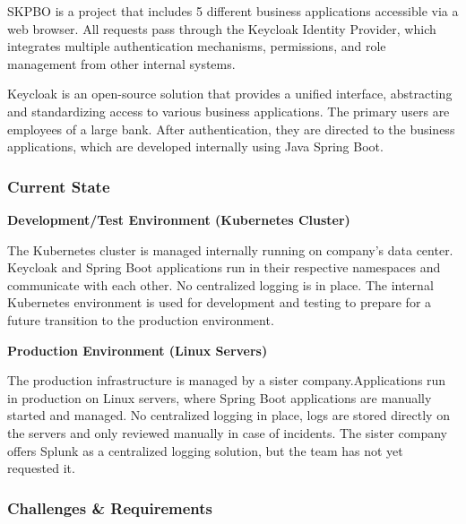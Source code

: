 \documentclass[../main.tex]{subfiles}
\begin{document}
SKPBO is a project that includes 5 different business applications accessible via a web browser. All requests pass through the Keycloak Identity Provider, which integrates multiple authentication mechanisms, permissions, and role management from other internal systems.

Keycloak is an open-source solution that provides a unified interface, abstracting and standardizing access to various business applications. The primary users are employees of a large bank. After authentication, they are directed to the business applications, which are developed internally using Java Spring Boot.

\subsubsection{Current State}

\textbf{Development/Test Environment (Kubernetes Cluster)}

The Kubernetes cluster is managed internally running on company's data center. Keycloak and Spring Boot applications run in their respective namespaces and communicate with each other. No centralized logging is in place. The internal Kubernetes environment is used for development and testing to prepare for a future transition to the production environment.

\textbf{Production Environment (Linux Servers)}

The production infrastructure is managed by a sister company.Applications run in production on Linux servers, where Spring Boot applications are manually started and managed. No centralized logging in place, logs are stored directly on the servers and only reviewed manually in case of incidents. The sister company offers Splunk as a centralized logging solution, but the team has not yet requested it.

\subsubsection{Challenges \& Requirements}
\end{document}
